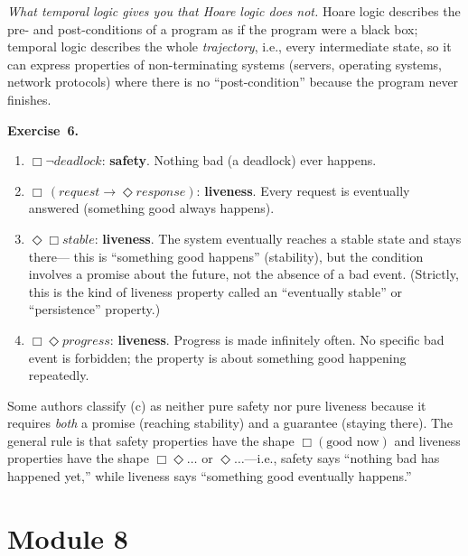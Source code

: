 \documentclass[11pt]{article}
\begin{document}
\emph{What temporal logic gives you that Hoare logic does not.}
Hoare logic describes the pre- and post-conditions of a program as if
the program were a black box; temporal logic describes the whole
\emph{trajectory}, i.e., every intermediate state, so it can express
properties of non-terminating systems (servers, operating systems,
network protocols) where there is no ``post-condition'' because the
program never finishes.

\medskip
\textbf{Exercise~6.}
\begin{enumerate}[label=(\alph*)]
  \item $\Box \lnot \mathit{deadlock}$: \textbf{safety}.  Nothing bad
        (a deadlock) ever happens.

  \item $\Box\,(\mathit{request} \to \Diamond \mathit{response})$:
        \textbf{liveness}.  Every request is eventually answered
        (something good always happens).

  \item $\Diamond \Box \mathit{stable}$: \textbf{liveness}.  The
        system eventually reaches a stable state and stays there---
        this is ``something good happens'' (stability), but the
        condition involves a promise about the future, not the
        absence of a bad event.  (Strictly, this is the kind of
        liveness property called an ``eventually stable'' or
        ``persistence'' property.)

  \item $\Box \Diamond \mathit{progress}$: \textbf{liveness}.
        Progress is made infinitely often.  No specific bad event is
        forbidden; the property is about something good happening
        repeatedly.
\end{enumerate}

Some authors classify (c) as neither pure safety nor pure liveness
because it requires \emph{both} a promise (reaching stability) and a
guarantee (staying there).  The general rule is that safety properties
have the shape $\Box(\text{good now})$ and liveness properties have
the shape $\Box \Diamond \ldots$ or $\Diamond \ldots$---i.e., safety
says ``nothing bad has happened yet,'' while liveness says
``something good eventually happens.''

\section*{Module 8}
\end{document}
